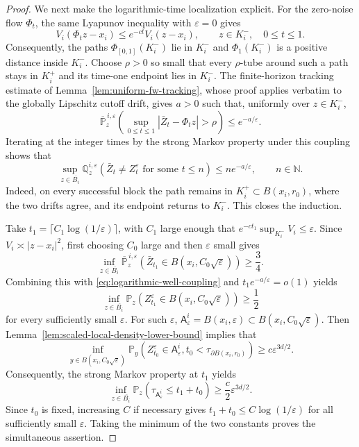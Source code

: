 \documentclass[11pt]{article}
\numberwithin{equation}{section}
\theoremstyle{plain}
\theoremstyle{definition}
\theoremstyle{remark}
\newcommand{\eps}{\varepsilon}
\newcommand{\Pbb}{\mathbb P}
\begin{document}
\begin{proof}
	We next make the logarithmic-time localization explicit.  For the zero-noise
	flow $\Phi_t$, the same Lyapunov inequality with $\eps=0$ gives
	\[
	V_i(\Phi_tz-x_i)\le e^{-ct}V_i(z-x_i),
	\qquad z\in K_i^-,\quad 0\le t\le1.
	\]
	Consequently, the paths $\Phi_{[0,1]}(K_i^-)$ lie in $K_i^-$ and
	$\Phi_1(K_i^-)$ is a positive distance inside $K_i^-$.  Choose $\rho>0$ so
	small that every $\rho$-tube around such a path stays in $K_i^+$ and its
	time-one endpoint lies in $K_i^-$.  The finite-horizon tracking estimate of
	Lemma~\ref{lem:uniform-fw-tracking}, whose proof applies verbatim to the
	globally Lipschitz cutoff drift, gives $a>0$ such that, uniformly over
	$z\in K_i^-$,
	\[
	\overline{\Pbb}_z^{\,i,\eps}\left(
	\sup_{0\le t\le1}|\bar Z_t-\Phi_tz|>\rho\right)
	\le e^{-a/\eps}.
	\]
	Iterating at the integer times by the strong Markov property under this
	coupling shows that
	\begin{equation}
	\label{eq:logarithmic-well-coupling}
	\sup_{z\in\overline{B_i}}
	\mathbb Q_z^{i,\eps}\left(\bar Z_t\ne Z_t^\eps
	\text{ for some }t\le n\right)
	\le ne^{-a/\eps},
	\qquad n\in\mathbb N.
	\end{equation}
	Indeed, on every successful block the path remains in
	$K_i^+\subset B(x_i,r_0)$, where the two drifts agree, and its endpoint
	returns to $K_i^-$.  This closes the induction.

	Take
	$t_1=\lceil C_1\log(1/\eps)\rceil$, with $C_1$ large enough that
	$e^{-ct_1}\sup_{K_i^-}V_i\le\eps$.  Since $V_i\asymp|z-x_i|^2$, first
	choosing $C_0$ large and then $\eps$ small gives
	\[
	\inf_{z\in\overline{B_i}}
	\overline{\Pbb}_z^{\,i,\eps}\left(
	\bar Z_{t_1}\in B(x_i,C_0\sqrt\eps)\right)\ge\frac34.
	\]
	Combining this with \eqref{eq:logarithmic-well-coupling} and
	$t_1e^{-a/\eps}=o(1)$ yields
	\[
	\inf_{z\in\overline{B_i}}
	\Pbb_z\left(Z_{t_1}^\eps\in B(x_i,C_0\sqrt\eps)\right)\ge\frac12
	\]
	for every sufficiently small $\eps$.  For such $\eps$,
	$\mathsf A_\eps^i=B(x_i,\eps)\subset B(x_i,C_0\sqrt\eps)$.  Then
	Lemma~\ref{lem:scaled-local-density-lower-bound} implies that
\[
\inf_{y\in B(x_i,C_0\sqrt\eps)}
\Pbb_y\!\left(
Z_{t_0}^\eps\in\mathsf A_\eps^i,
t_0<\tau_{\partial B(x_i,r_0)}
\right)
\ge c\eps^{3d/2}.
	\]
	Consequently, the strong Markov property at $t_1$ yields
	\[
	\inf_{z\in\overline{B_i}}
	\Pbb_z\!\left(\tau_{\mathsf A_\eps^i}\le t_1+t_0\right)
	\ge \frac{c}{2}\eps^{3d/2}.
	\]
Since $t_0$ is fixed, increasing $C$ if necessary gives
$t_1+t_0\le C\log(1/\eps)$ for all sufficiently small $\eps$.  Taking the
minimum of the two constants proves the simultaneous assertion.
\end{proof}
\end{document}
